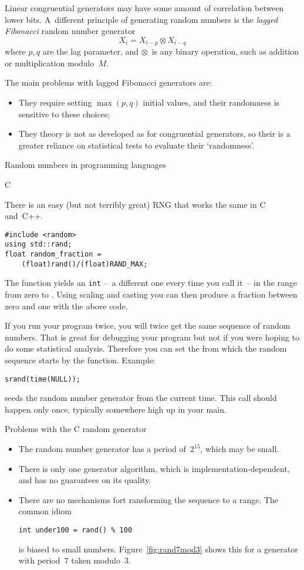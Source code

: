 Linear congruential generators may have some amount of correlation
between lower bits. A~different principle of generating random numbers
is the
\emph{lagged Fibonacci}
random number generator
\[ X_i = X_{i-p}\otimes X_{i-q} \]
where $p,q$ are the lag parameter, and $\otimes$~is any binary operation,
such as addition or multiplication modulo~$M$.

The main problems with lagged Fibonacci generators are:
\begin{itemize}
\item They require setting $\max(p,q)$ initial values, and their
  randomness is sensitive to these choices;
\item They theory is not as developed as for congruential generators,
  so their is a greater reliance on statistical tests to evaluate
  their `randomness'.
\end{itemize}

 {Random numbers in programming languages}

 {C}
\lstset{language=C}

There is an easy (but not terribly great)
\ac{RNG}
that works the same in C and~C++.
%
\begin{lstlisting}
#include <random>
using std::rand;
float random_fraction =
    (float)rand()/(float)RAND_MAX;
\end{lstlisting}
%
The function  yields an \lstinline{int}
--~a different one every time you call it~--
in the range from zero to .
Using scaling and casting you can then produce a fraction between zero
and one with the above code.

If you run your program twice, you will twice get the same sequence of
random numbers. That is great for debugging your program but not if
you were hoping to do some statistical analysis. Therefore you can set
the  from which the random sequence
starts by the  function. Example:
\begin{lstlisting}
srand(time(NULL));
\end{lstlisting}
seeds the random number generator from the current time.
This call should happen only once, typically somewhere high up in your main.

 {Problems with the C random generator}

\begin{itemize}
\item The random number generator has a period of~$2^{15}$, which may be small.
\item There is only one generator algorithm, which is implementation-dependent,
  and has no guarantees on its quality.
\item There are no mechanisms fort ransforming the sequence to a range.
  The common idiom
\begin{lstlisting}
int under100 = rand() % 100
\end{lstlisting}
is biased to small numbers. Figure~\ref{fig:rand7mod3} shows this
for a generator with period~7 taken modulo~3.
\end{itemize}

